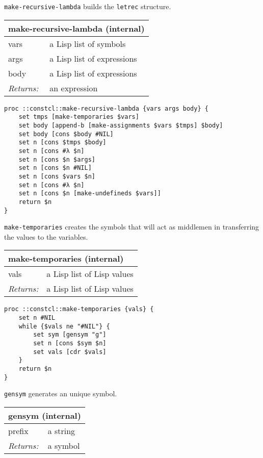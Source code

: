 \documentclass{report}
\begin{document}
\texttt{make-recursive-lambda} builds the \texttt{letrec} structure.

\begin{tabular}{ |l l| }
\hline
\multicolumn{2}{|l|}{make-recursive-lambda (internal)} \\
\hline
vars & a Lisp list of symbols \\
args & a Lisp list of expressions \\
body & a Lisp list of expressions \\
\textit{Returns:} & an expression \\
\hline
\end{tabular}

\noindent\makebox[\linewidth]{\rule{\linewidth}{0.4pt}}
\begin{lstlisting}
proc ::constcl::make-recursive-lambda {vars args body} {
    set tmps [make-temporaries $vars]
    set body [append-b [make-assignments $vars $tmps] $body]
    set body [cons $body #NIL]
    set n [cons $tmps $body]
    set n [cons #λ $n]
    set n [cons $n $args]
    set n [cons $n #NIL]
    set n [cons $vars $n]
    set n [cons #λ $n]
    set n [cons $n [make-undefineds $vars]]
    return $n
}
\end{lstlisting}
\noindent\makebox[\linewidth]{\rule{\linewidth}{0.4pt}}

\texttt{make-temporaries} creates the symbols that will act as middlemen in transferring the values to the variables.

\begin{tabular}{ |l l| }
\hline
\multicolumn{2}{|l|}{make-temporaries (internal)} \\
\hline
vals & a Lisp list of Lisp values \\
\textit{Returns:} & a Lisp list of Lisp values \\
\hline
\end{tabular}

\noindent\makebox[\linewidth]{\rule{\linewidth}{0.4pt}}
\begin{lstlisting}
proc ::constcl::make-temporaries {vals} {
    set n #NIL
    while {$vals ne "#NIL"} {
        set sym [gensym "g"]
        set n [cons $sym $n]
        set vals [cdr $vals]
    }
    return $n
}
\end{lstlisting}
\noindent\makebox[\linewidth]{\rule{\linewidth}{0.4pt}}

\texttt{gensym} generates an unique symbol.

\begin{tabular}{ |l l| }
\hline
\multicolumn{2}{|l|}{gensym (internal)} \\
\hline
prefix & a string \\
\textit{Returns:} & a symbol \\
\hline
\end{tabular}
\end{document}
